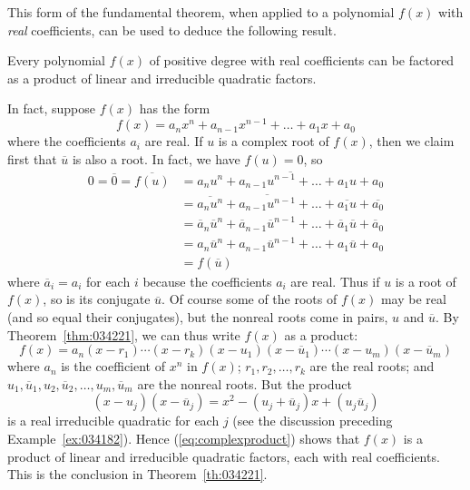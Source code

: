 \documentclass{ximera}
\begin{document}
This form of the fundamental theorem, when applied to a polynomial $f(x)$ with \textit{real} coefficients, can be used to deduce the following result.

\begin{theorem}\label{th:034221}
Every polynomial $f(x)$ of positive
degree with real coefficients can be factored as a product of linear and
 irreducible quadratic factors.
\end{theorem}

In fact, suppose $f(x)$ has the form
\begin{equation*}
f(x) = a_nx^n + a_{n-1}x^{n-1} + \ldots + a_1x + a_0
\end{equation*}
where the coefficients $a_{i}$ are real. If $u$ is a complex root of $f(x)$, then we claim first that $\overline{u}$
 is also a root. In fact, we have $f(u) = 0$, so
\begin{align*}
0 = \overline{0} = \overline{f(u)} & = \overline{a_nu^n + a_{n-1}u^{n-1} + \ldots + a_1u + a_0 } \\
& = \overline{a_nu^n} + \overline{a_{n-1}u^{n-1}} + \ldots + \overline{a_1u} + \overline{a_0 } \\
& = \overline{a}_n\overline{u}^n + \overline{a}_{n-1}\overline{u}^{n-1} + \ldots + \overline{a}_1\overline{u} + \overline{a}_0 \\
& = a_n\overline{u}^n + a_{n-1}\overline{u}^{n-1} + \ldots + a_1\overline{u} + a_0 \\
&= f(\overline{u})
\end{align*}
where $\overline{a}_i = a_i$
 for each $i$ because the coefficients $a_{i}$ are real. Thus if $u$ is a root of $f(x)$, so is its conjugate $\overline{u}$. Of course some of the roots of $f(x)$ may be real (and so equal their conjugates), but the nonreal roots come in pairs, $u$ and $\overline{u}$. By Theorem~\ref{thm:034221}, we can thus write $f(x)$ as a product:
\begin{equation}\label{eq:complexproduct}
f(x) = a_n(x-r_1)\cdots(x-r_k)(x-u_1)(x-\overline{u}_1)\cdots (x-u_m)(x-\overline{u}_m)
\end{equation}
where $a_{n}$ is the coefficient of $x^{n}$ in $f(x)$; $r_{1}, r_{2}, \dots , r_{k}$ are the real roots; and $u_{1}, \overline{u}_{1}, u_{2}, \overline{u}_{2}, \dots , u_{m}, \overline{u}_{m}$ are the nonreal roots. But the product
\begin{equation*}
(x-u_j)(x-\overline{u}_j) = x^2 - (u_j + \overline{u}_j)x +(u_j \overline{u}_j)
\end{equation*}
is a real irreducible quadratic for each $j$ (see the discussion preceding Example~\ref{ex:034182}). Hence (\ref{eq:complexproduct}) shows that $f(x)$ is a product of linear and irreducible quadratic factors, each with real coefficients. This is the conclusion in Theorem~\ref{th:034221}.
\end{document}
